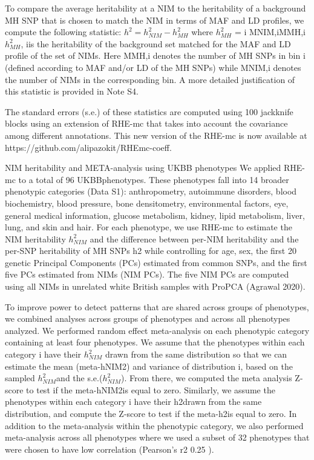To compare the average heritability at a NIM to the heritability of a background MH SNP that is chosen to match the NIM in terms of MAF and LD profiles, we compute the following statistic:
$h^2=h^2_{NIM}-h^2_{MH}$ 
where $h^2_{MH}$ = i MNIM,iMMH,i $h^2_{MH}$, iis the heritability of the background set matched for the MAF and LD profile of the set of NIMs. Here MMH,i denotes the number of MH SNPs in bin i  (defined according to MAF and/or LD of the MH SNPs) while MNIM,i denotes the number of NIMs in the corresponding bin. A more detailed justification of this statistic is provided in Note S4.

The standard errors (s.e.) of these statistics are computed using 100 jackknife blocks using an extension of RHE-mc that takes into account the covariance among different annotations. This new version of the RHE-mc is now available at https://github.com/alipazokit/RHEmc-coeff. 

NIM heritability and META-analysis using UKBB phenotypes
We applied RHE-mc to a total of 96 UKBBphenotypes. These phenotypes fall into 14 broader phenotypic categories (Data S1): anthropometry, autoimmune disorders, blood biochemistry, blood pressure, bone densitometry, environmental factors, eye, general medical information, glucose metabolism, kidney, lipid metabolism, liver, lung, and skin and hair. For each phenotype, we use RHE-mc to estimate the NIM heritability $h^2_{NIM}$ and the difference between per-NIM heritability and the per-SNP heritability of MH SNPs h2 while controlling for age, sex, the first 20 genetic Principal Components (PCs) estimated from common SNPs, and the first five PCs estimated from NIMs (NIM PCs). The five NIM PCs are computed using all NIMs in unrelated white British samples with ProPCA (Agrawal 2020). 


To improve power to detect patterns that are shared across groups of phenotypes, we combined analyses across groups of phenotypes and across all phenotypes analyzed. We performed random effect meta-analysis on each phenotypic category containing at least four phenotypes. We assume that the phenotypes within each category i have their $h^2_{NIM}$ drawn from the same distribution so that we can estimate the mean (meta-hNIM2) and variance of distribution i, based on the sampled $h^2_{NIM}$and the s.e.($h^2_{NIM}$). From there, we computed the meta analysis Z-score to test if the meta-hNIM2is equal to zero. Similarly, we assume the phenotypes within each category i have their h2drawn from the same distribution, and compute the Z-score to test if the meta-h2is equal to zero. In addition to the meta-analysis within the phenotypic category, we also performed meta-analysis across all phenotypes where we used a subset of 32 phenotypes that were chosen to have low correlation (Pearson’s r2   0.25 ). 

